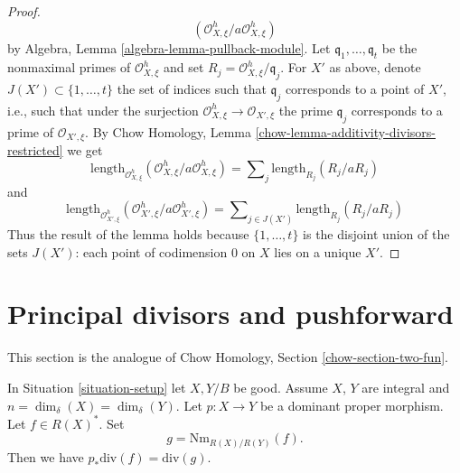 \begin{proof}
$$(\mathcal{O}_{X, \xi}^h/a \mathcal{O}_{X, \xi}^h)
$$
by Algebra, Lemma \ref{algebra-lemma-pullback-module}.
Let $\mathfrak q_1, \ldots, \mathfrak q_t$ be the nonmaximal
primes of $\mathcal{O}_{X, \xi}^h$ and set
$R_j = \mathcal{O}_{X, \xi}^h/\mathfrak q_j$.
For $X'$ as above, denote $J(X') \subset \{1, \ldots, t\}$
the set of indices such that $\mathfrak q_j$ corresponds
to a point of $X'$, i.e., such that under the surjection
$\mathcal{O}_{X, \xi}^h \to \mathcal{O}_{X', \xi}$
the prime $\mathfrak q_j$ corresponds to a prime
of $\mathcal{O}_{X', \xi}$.
By Chow Homology, Lemma \ref{chow-lemma-additivity-divisors-restricted}
we get
$$
\text{length}_{\mathcal{O}_{X, \xi}^h}
(\mathcal{O}_{X, \xi}^h/a \mathcal{O}_{X, \xi}^h) =
\sum\nolimits_j \text{length}_{R_j}(R_j/a R_j)
$$
and
$$
\text{length}_{\mathcal{O}_{X', \xi}^h}
(\mathcal{O}_{X', \xi}^h/a \mathcal{O}_{X', \xi}^h) =
\sum\nolimits_{j \in J(X')} \text{length}_{R_j}(R_j/a R_j)
$$
Thus the result of the lemma holds because
$\{1, \ldots, t\}$ is the disjoint union of the sets $J(X')$:
each point of codimension $0$ on $X$ lies on a unique $X'$.
\end{proof}







\section{Principal divisors and pushforward}
\label{section-two-fun}

\noindent
This section is the analogue of
Chow Homology, Section \ref{chow-section-two-fun}.

\begin{lemma}
\label{lemma-proper-pushforward-alteration}
In Situation \ref{situation-setup} let $X, Y/B$ be good.
Assume $X$, $Y$ are integral and $n = \dim_\delta(X) = \dim_\delta(Y)$.
Let $p : X \to Y$ be a dominant proper morphism.
Let $f \in R(X)^*$. Set
$$
g = \text{Nm}_{R(X)/R(Y)}(f).
$$
Then we have
$p_*\text{div}(f) = \text{div}(g)$.
\end{lemma}


